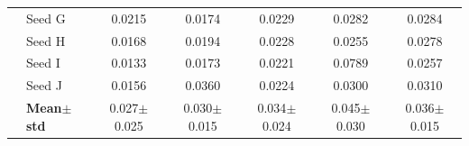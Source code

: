 \begin{table}[H]
{\begin{tabular}{@{}llccccc@{}}
  & Seed G & {\small 0.0215} & {\small 0.0174} & {\small 0.0229} & {\small 0.0282} & {\small 0.0284} \\
  & Seed H & {\small 0.0168} & {\small 0.0194} & {\small 0.0228} & {\small 0.0255} & {\small 0.0278} \\
  & Seed I & {\small 0.0133} & {\small 0.0173} & {\small 0.0221} & {\small 0.0789} & {\small 0.0257} \\
  & Seed J & {\small 0.0156} & {\small 0.0360} & {\small 0.0224} & {\small 0.0300} & {\small 0.0310} \\
 & \textbf{Mean$\pm$std} & \cellcolor{ForestGreen!25}0.027$\pm$0.025 & \cellcolor{ForestGreen!25}0.030$\pm$0.015 & \cellcolor{ForestGreen!25}0.034$\pm$0.024 & \cellcolor{ForestGreen!25}0.045$\pm$0.030 & \cellcolor{ForestGreen!25}0.036$\pm$0.015 \\
\bottomrule
\end{tabular}
}
\end{table}

